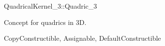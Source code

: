 
\begin{ccRefConcept}{QuadricalKernel_3::Quadric_3}

Concept for quadrics in 3D.

\ccRefines
CopyConstructible, Assignable, DefaultConstructible

\ccHasModels
{}
\end{ccRefConcept}
